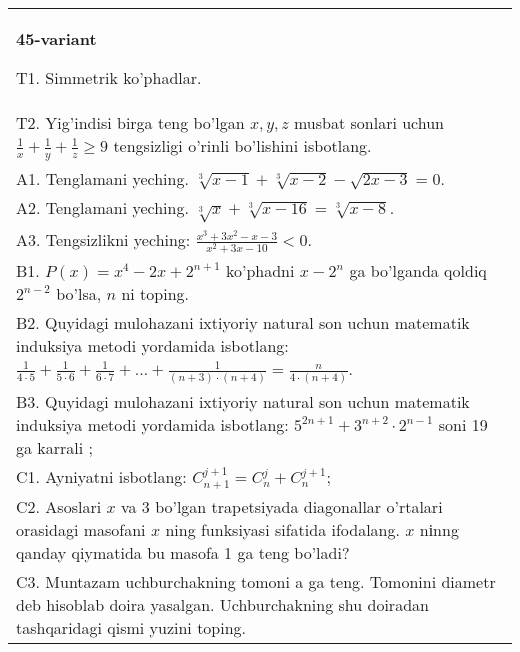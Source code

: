 \documentclass{article}
\begin{document}
\begin{tabular}{m{17cm}}
\textbf{45-variant}
\newline

T1. Simmetrik ko'phadlar. \\
T2. Yig'indisi birga teng bo'lgan \(x,y,z\) musbat sonlari uchun \(\frac{1}{x} + \frac{1}{y} + \frac{1}{z} \geq 9\) tengsizligi o'rinli bo'lishini isbotlang. \\
A1. Tenglamani yeching. \(\sqrt[3]{x - 1} + \sqrt[3]{x - 2} - \sqrt{2x - 3} = 0\). \\
A2. Tenglamani yeching. \(\sqrt[3]{x} + \sqrt[3]{x - 16} = \sqrt[3]{x - 8}\). \\
A3. Tengsizlikni yeching: \(\frac{x^{3} + 3x^{2} - x - 3}{x^{2} + 3x - 10} < 0\). \\
B1. \(P(x) = x^{4} - 2x + 2^{n + 1}\) ko'phadni \(x - 2^{n}\) ga bo'lganda qoldiq \(2^{n - 2}\) bo'lsa, \(n\) ni toping. \\
B2. Quyidagi mulohazani ixtiyoriy natural son uchun matematik induksiya metodi yordamida isbotlang: \(\frac{1}{4 \cdot 5} + \frac{1}{5 \cdot 6} + \frac{1}{6 \cdot 7} + \ldots + \frac{1}{(n + 3) \cdot (n + 4)} = \frac{n}{4 \cdot (n + 4)}\). \\
B3. Quyidagi mulohazani ixtiyoriy natural son uchun matematik induksiya metodi yordamida isbotlang: \(5^{2n + 1} + 3^{n + 2} \cdot 2^{n - 1}\) soni 19 ga karrali ; \\
C1. Ayniyatni isbotlang: \(C_{n + 1}^{j + 1} = C_{n}^{j} + C_{n}^{j + 1}\); \\
C2. Asoslari \(x\) va 3 bo'lgan trapetsiyada diagonallar o'rtalari orasidagi masofani \(x\) ning funksiyasi sifatida ifodalang. \(x\) nіnng qanday qiymatida bu masofa 1 ga teng bo'ladi? \\
C3. Muntazam uchburchakning tomoni a ga teng. Tomonini diametr deb hisoblab doira yasalgan. Uchburchakning shu doiradan tashqaridagi qismi yuzini toping. \\

\end{tabular}
\vspace{1cm}
\end{document}
